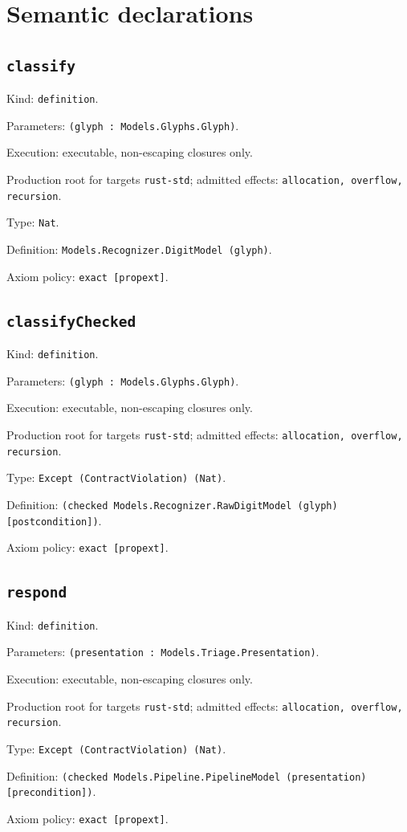 \documentclass[11pt]{article}
\begin{document}
\section*{Semantic declarations}
\subsection*{\texttt{classify}}
\noindent Kind: \texttt{definition}.\par
\noindent Parameters: \texttt{(glyph : Models.Glyphs.Glyph)}.\par
\noindent Execution: executable, non-escaping closures only.\par
\noindent Production root for targets \texttt{rust-std}; admitted effects: \texttt{allocation, overflow, recursion}.\par
\noindent Type: \texttt{Nat}.\par
\noindent Definition: \texttt{Models.Recognizer.DigitModel (glyph)}.\par
\noindent Axiom policy: \texttt{exact [propext]}.\par
\subsection*{\texttt{classifyChecked}}
\noindent Kind: \texttt{definition}.\par
\noindent Parameters: \texttt{(glyph : Models.Glyphs.Glyph)}.\par
\noindent Execution: executable, non-escaping closures only.\par
\noindent Production root for targets \texttt{rust-std}; admitted effects: \texttt{allocation, overflow, recursion}.\par
\noindent Type: \texttt{Except (ContractViolation) (Nat)}.\par
\noindent Definition: \texttt{(checked Models.Recognizer.RawDigitModel (glyph) [postcondition])}.\par
\noindent Axiom policy: \texttt{exact [propext]}.\par
\subsection*{\texttt{respond}}
\noindent Kind: \texttt{definition}.\par
\noindent Parameters: \texttt{(presentation : Models.Triage.Presentation)}.\par
\noindent Execution: executable, non-escaping closures only.\par
\noindent Production root for targets \texttt{rust-std}; admitted effects: \texttt{allocation, overflow, recursion}.\par
\noindent Type: \texttt{Except (ContractViolation) (Nat)}.\par
\noindent Definition: \texttt{(checked Models.Pipeline.PipelineModel (presentation) [precondition])}.\par
\noindent Axiom policy: \texttt{exact [propext]}.\par
\end{document}

